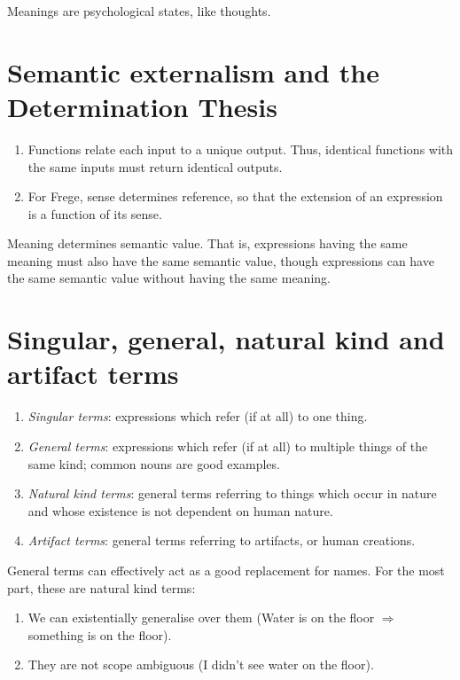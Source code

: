 \begin{definition}
Meanings are psychological states, like thoughts.
\end{definition}

\section{Semantic externalism and the Determination Thesis}

\begin{enumerate}[label=(\alph*)]
  \item Functions relate each input to a unique output. Thus, identical functions with the same inputs must return identical outputs.
  \item For Frege, sense determines reference, so that the extension of an expression is a function of its sense.
\end{enumerate}

\begin{definition}
Meaning determines semantic value. That is, expressions having the same meaning must also have the same semantic value, though expressions can have the same semantic value without having the same meaning.
\end{definition}

\section{Singular, general, natural kind and artifact terms}

\begin{definition}\leavevmode
\begin{enumerate}[label=(\alph*)]
  \item \emph{Singular terms}: expressions which refer (if at all) to one thing.
  \item \emph{General terms}: expressions which refer (if at all) to multiple things of the same kind; common nouns are good examples.
  \item \emph{Natural kind terms}: general terms referring to things which occur in nature and whose existence is not dependent on human nature.
  \item \emph{Artifact terms}: general terms referring to artifacts, or human creations.
\end{enumerate}
\end{definition}

\begin{note}
General terms can effectively act as a good replacement for names. For the most part, these are natural kind terms:
\begin{enumerate}
  \item We can existentially generalise over them (Water is on the floor $\Rightarrow$ something is on the floor).
  \item They are not scope ambiguous (I didn't see water on the floor).
\end{enumerate}
\end{note}

